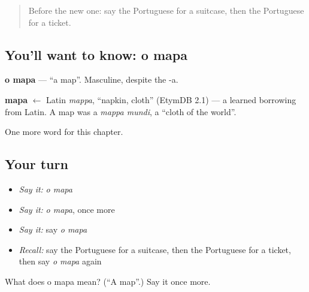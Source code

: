 \label{lesson:PT-C54-mapa}



\begin{quote}
Before the new one: say the Portuguese for a suitcase, then the Portuguese for a ticket.
\end{quote}

\subsection*{You'll want to know: o mapa}
\textbf{o mapa} — \textquotedblleft{}a map\textquotedblright{}. Masculine, despite the -a.

\begin{cousinweb}
\textbf{mapa} $\leftarrow$ Latin \emph{mappa}, \textquotedblleft{}napkin, cloth\textquotedblright{} (EtymDB 2.1) — a learned borrowing from Latin. A map was a \emph{mappa mundi}, a \textquotedblleft{}cloth of the world\textquotedblright{}.
\end{cousinweb}

\begin{grammarlens}[title={What you've built}]
One more word for this chapter.
\end{grammarlens}

\subsection*{Your turn}
\begin{itemize}
\raggedright
  \item \emph{Say it:} \emph{o mapa}
  \item \emph{Say it:} \emph{o mapa}, once more
  \item \emph{Say it:} say \emph{o mapa}
  \item \emph{Recall:} say the Portuguese for a suitcase, then the Portuguese for a ticket, then say \emph{o mapa} again
\end{itemize}

\begin{tcolorbox}[breakable,colback=teal!4,colframe=teal!35!black,title={Before you move on}]
What does o mapa mean? (\textquotedblleft{}A map\textquotedblright{}.) Say it once more.
\end{tcolorbox}

